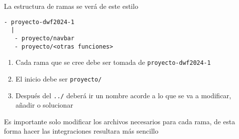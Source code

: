 \documentclass[a4paper,12pt]{article}
\begin{document}
La estructura de ramas se verá de este estilo
\begin{verbatim}
- proyecto-dwf2024-1
  |
   - proyecto/navbar
   - proyecto/<otras funciones>
\end{verbatim}

\begin{enumerate}
    \item Cada rama que se cree debe ser tomada de \texttt{proyecto-dwf2024-1} 
    \item El inicio debe ser \texttt{proyecto/}
    \item Después del \texttt{../}  deberá ir un nombre acorde a lo que se va a modificar, añadir o solucionar
\end{enumerate}

Es importante solo modificar los archivos necesarios para cada rama, de esta forma hacer las integraciones resultara más sencillo 
\end{document}
